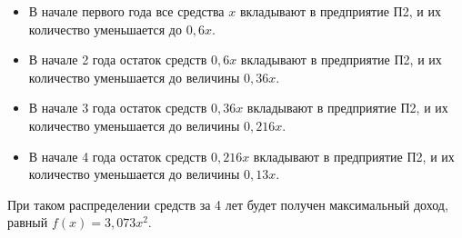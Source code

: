 \documentclass[12pt]{article}
\begin{document}
\begin{itemize}

\item В начале первого года все средства $ x $ вкладывают в предприятие П2, и их количество уменьшается до $ 0{,}6 x $.

\item В начале 2 года остаток средств $ 0{,}6 x $ вкладывают в предприятие П2, и их количество уменьшается до величины $ 0{,}36 x $.

\item В начале 3 года остаток средств $ 0{,}36 x $ вкладывают в предприятие П2, и их количество уменьшается до величины $ 0{,}216 x $.

\item В начале 4 года остаток средств $ 0{,}216 x $ вкладывают в предприятие П2, и их количество уменьшается до величины $ 0{,}13 x $.

\end{itemize}

При таком распределении средств за 4 лет будет получен максимальный доход, равный $ f(x) = 3{,}073 x^{2} $.
\end{document}
